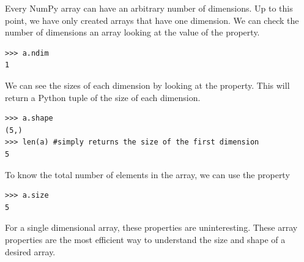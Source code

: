 Every NumPy array can have an arbitrary number of dimensions.  
Up to this point, we have only created arrays that have one dimension.
We can check the number of dimensions an array looking at the value of the  property.
\begin{lstlisting}
>>> a.ndim
1
\end{lstlisting}
We can see the sizes of each dimension by looking at the  property.
This will return a Python tuple of the size of each dimension.
\begin{lstlisting}
>>> a.shape
(5,)
>>> len(a) #simply returns the size of the first dimension
5
\end{lstlisting}
To know the total number of elements in the array, we can use the  property
\begin{lstlisting}
>>> a.size
5
\end{lstlisting}
For a single dimensional array, these properties are uninteresting.  
These array properties are the most efficient way to understand the size and shape of a desired array.

